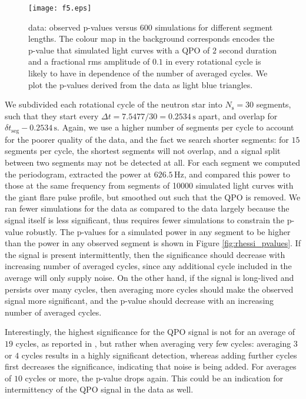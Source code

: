 \documentclass{emulateapj}
\begin{document}
\begin{figure}[htbp]
\begin{center}
\texttt{[image: f5.eps]}
\caption{\rhessi data: observed p-values versus $600$ simulations for different segment lengths. The colour map in the background corresponds encodes the p-value that simulated light curves with a QPO of $2$ second duration and a fractional rms amplitude of $0.1$ in every rotational cycle is likely to have in dependence of the number of averaged cycles. We plot the p-values derived from the \rhessi data as light blue triangles.}

\label{fig:rhessi_sims1_pvalues}
\end{center}
\end{figure}
We subdivided each rotational cycle of the neutron star into $N_\mathrm{s} = 30$ segments, such that they start every $\Delta t = 7.5477/30 = 0.2534 \, \mathrm{s}$ apart, and overlap for $\delta t_\mathrm{seg} - 0.2534 \, \mathrm{s}$. Again, we use a higher number of segments per cycle to account for the poorer quality of the \rhessi data, and the fact we search shorter segments: for $15$ segments per cycle, the shortest segments will not overlap, and a signal split between two segments may not be detected at all.
For each segment we computed the periodogram, extracted the power at $626.5 \, \mathrm{Hz}$, and compared this power to those at the same frequency from segments of 10000 simulated light curves with the giant flare pulse profile, but smoothed out such that the QPO is removed. We ran fewer simulations for the \rhessi data as compared to the \rxte data largely because the signal itself is less significant, thus requires fewer simulations to constrain the p-value robustly. 
The p-values for a simulated power in any segment to be higher than the power in any observed segment is shown in Figure \ref{fig:rhessi_pvalues}. If the signal is present intermittently, then the significance should decrease with increasing number of averaged cycles, since any additional cycle included in the average will only supply noise. On the other hand, if the signal is long-lived and persists over many cycles, then averaging more cycles should make the observed signal more significant, and the p-value should decrease with an increasing number of averaged cycles.

Interestingly, the highest significance for the QPO signal is not for an average of $19$ cycles, as reported in \citet{Watts06}, but rather when averaging very few cycles: averaging $3$ or $4$ cycles results in a highly significant detection, whereas adding further cycles first decreases the significance, indicating that noise is being added. For averages of $10$ cycles or more, the p-value drops again. This could be an indication for intermittency of the QPO signal in the \rhessi data as well.
\end{document}
